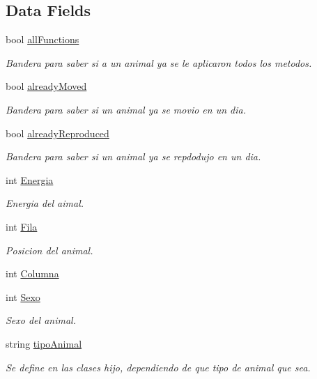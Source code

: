 \subsection*{Data Fields}
\begin{DoxyCompactItemize}
\item 
bool \hyperlink{classAnimal_ad014642901894565334b8d2bf3713755}{all\+Functions}
\begin{DoxyCompactList}\small\item\em Bandera para saber si a un animal ya se le aplicaron todos los metodos. \end{DoxyCompactList}\item 
bool \hyperlink{classAnimal_a1cc0126c23d1245a1f964ce636552bba}{already\+Moved}
\begin{DoxyCompactList}\small\item\em Bandera para saber si un animal ya se movio en un dia. \end{DoxyCompactList}\item 
bool \hyperlink{classAnimal_ab08fe103b56326ac66c63b0f38585c4c}{already\+Reproduced}
\begin{DoxyCompactList}\small\item\em Bandera para saber si un animal ya se repdodujo en un dia. \end{DoxyCompactList}\item 
int \hyperlink{classAnimal_af1c30573e35f61baa10094579c5e741a}{Energia}
\begin{DoxyCompactList}\small\item\em Energia del aimal. \end{DoxyCompactList}\item 
int \hyperlink{classAnimal_ab403adfd13b57143eff123bdd6a2febb}{Fila}
\begin{DoxyCompactList}\small\item\em Posicion del animal. \end{DoxyCompactList}\item 
int \hyperlink{classAnimal_a340d64e6e4ffe5f35e0855c63aad1bd3}{Columna}
\item 
int \hyperlink{classAnimal_a42b629ae5a7e0c05263a3f6e592ea116}{Sexo}
\begin{DoxyCompactList}\small\item\em Sexo del animal. \end{DoxyCompactList}\item 
string \hyperlink{classAnimal_ae7a4f121949d20c359414a3002e7eff7}{tipo\+Animal}
\begin{DoxyCompactList}\small\item\em Se define en las clases hijo, dependiendo de que tipo de animal que sea. \end{DoxyCompactList}\end{DoxyCompactItemize}


